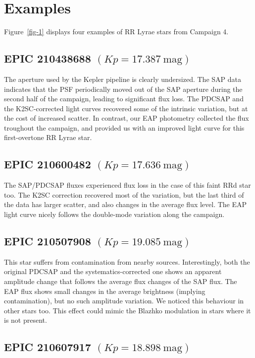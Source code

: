\documentclass[epj,twocolumn]{webofc}
\begin{document}
\section{Examples}
\label{sec-2}



Figure~\ref{fig-1} displays four examples of RR Lyrae stars from Campaign 4.

\subsection{EPIC 210438688 $({Kp} = 17.387 ~\mathrm{ mag})$}

 The aperture used by the Kepler pipeline is clearly undersized. The SAP  data indicates that the PSF periodically moved out of the SAP aperture during the second half of the campaign, leading to significant flux loss. 
The PDCSAP and the K2SC-corrected light curves recovered some of the intrinsic variation, but at the cost of increased scatter. 
In contrast, our EAP photometry collected the flux troughout the campaign, and provided us with an improved light curve for this first-overtone RR Lyrae star.

\subsection{EPIC 210600482 $({Kp} = 17.636 ~\mathrm{ mag})$}

The SAP/PDCSAP fluxes experienced flux loss in the case of this faint RRd star too. The K2SC correction recovered most of the variation, but the last third of the data has larger scatter, and also changes in the average flux level. The EAP light curve nicely follows the double-mode variation along the campaign.

\subsection{EPIC 210507908 $({Kp} = 19.085 ~\mathrm{ mag})$}

This star suffers from contamination from nearby sources. 
Interestingly, both the original PDCSAP and the systematics-corrected one shows an apparent amplitude change that follows the average flux changes of the SAP flux. The EAP flux shows small changes in the average brightness (implying contamination), but no such amplitude variation. We noticed this behaviour in other stars too. This effect could mimic the Blazhko modulation in stars where it is not present.

\subsection{EPIC 210607917 $({Kp} = 18.898 ~\mathrm{ mag})$}
\end{document}
